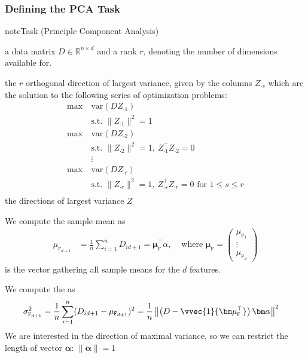 \documentclass[letterpaper,10pt,english]{jupyterBook}
\begin{document}
\subsubsection{Defining the PCA Task}
\label{\detokenize{dim_reduction_pca:defining-the-pca-task}}
\begin{sphinxadmonition}{note}{Task (Principle Component Analysis)}

\sphinxAtStartPar
{} a data matrix \(D\in\mathbb{R}^{n\times d}\) and a rank \(r\), denoting the number of dimensions available for.

\sphinxAtStartPar
{} the \(r\) orthogonal direction of largest variance, given by the columns \(Z_{\cdot s}\) which are the solution to the following series of optimization problems:
\label{equation:dim_reduction_pca:523333ec-d227-4b96-8486-4d990ac2c6e8}\begin{align}
    \max\ & \mathrm{var}(DZ_{\cdot 1}) \\
    &\text{s.t. } \lVert Z_{\cdot 1}\rVert^2=1\\
    \max\ & \mathrm{var}(DZ_{\cdot 2}) \\
    &\text{s.t. } \lVert Z_{\cdot 2}\rVert^2=1,\ Z_{\cdot 1}^\top Z_{\cdot 2}=0 \\
    &\vdots\\
    \max\ & \mathrm{var}(DZ_{\cdot r}) \\
    &\text{s.t. } \lVert Z_{\cdot r}\rVert^2=1,\ Z_{\cdot s}^\top Z_{\cdot r}=0 \text{ for } 1\leq s\leq r\\
\end{align}
\sphinxAtStartPar
{} the directions of largest variance \(Z\)
\end{sphinxadmonition}

\sphinxAtStartPar
We compute the sample mean as
\label{equation:dim_reduction_pca:9aa1fa1a-38a9-439a-aae3-f6823c047072}\begin{align}
    \mu_{\mathtt{F}_{d+1}} &= \frac1n \sum_{i=1}^n D_{i d+1}
    = {\bm \mu_\mathtt{F}^\top \alpha},
    &\text{ where }\bm\mu_\mathtt{F} = \begin{pmatrix}
  \mu_{\mathtt{F}_1}\\ \vdots \\ \mu_{\mathtt{F}_d}
\end{pmatrix}
\end{align}
\sphinxAtStartPar
is the vector gathering all sample means for the \(d\) features.

\sphinxAtStartPar
We compute the  as
\label{equation:dim_reduction_pca:e5a630fa-99e8-483e-a005-9ba790c5e0f1}\begin{align}
    \sigma_{\mathtt{F}_{d+1}}^2 &=\frac1n\sum_{i=1}^n (D_{id+1}-\mu_{\mathtt{F}_{d+1}})^2
    =\frac1n\left\lVert \left(D -\vvec{1}{\bm \mu_\mathtt{F}^\top }\right){\bm\alpha}\right\rVert^2
\end{align}
\sphinxAtStartPar
We are interested in the direction of maximal variance, so we can restrict the length of vector \(\bm{\alpha}\): \(\lVert\bm{\alpha}\rVert=1\)
\end{document}
